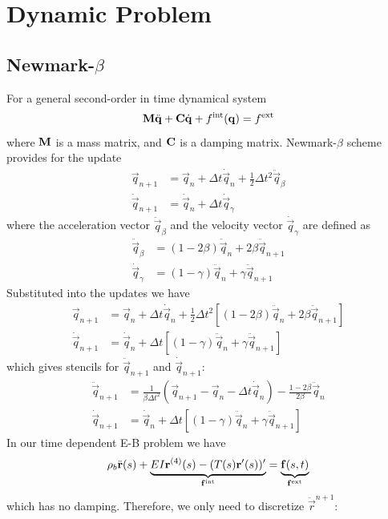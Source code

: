 \section{Dynamic Problem}

\subsection{\texorpdfstring{Newmark-\(\beta\)}{Newmark-beta}}

For a general second-order in time dynamical system
\begin{equation*}
    \mat M \ddot{\vec q} + \mat C \dot{\vec q} + f^{\rm int}(\vec q) = f^{\rm ext}
\end{equation*}
where \(\mat M\) is a mass matrix, and \(\mat C\) is a damping matrix. Newmark-\(\beta\) scheme provides for the update
\begin{align*}
    \vec q_{n+1}        & = \vec q_n + \Delta t \dot{\vec q}_n + \frac12 \Delta t^2 \ddot {\vec q}_\beta \\
    \dot {\vec q}_{n+1} & = \dot{\vec q}_n + \Delta t \dot{\vec q}_\gamma
\end{align*}
where the acceleration vector \(\ddot{\vec q}_\beta\) and the velocity vector \(\dot{\vec q}_\gamma\) are defined as
\begin{align*}
    \ddot{\vec q}_\beta   & = (1-2\beta) \ddot{\vec q}_n + 2\beta\ddot{\vec q}_{n+1}  \\
    \dot{\vec q}_{\gamma} & = (1- \gamma)\ddot{\vec q}_n + \gamma \ddot{\vec q}_{n+1}
\end{align*}
Substituted into the updates we have
\begin{align*}
    \vec q_{n+1}        & = \vec q_n + \Delta t \dot{\vec q}_n + \frac12 \Delta t^2  \left[(1-2\beta) \ddot{\vec q}_n + 2\beta \ddot{\vec q}_{n+1}\right] \\
    \dot {\vec q}_{n+1} & = \dot{\vec q}_n + \Delta t \left[(1- \gamma)\ddot{\vec q}_n + \gamma \ddot{\vec q}_{n+1}\right]
\end{align*}
which gives stencils for \(\ddot{\vec q}_{n+1}\) and \(\dot{\vec q}_{n+1}\):
\begin{align*}
    \ddot{\vec q}_{n+1} & = \frac{1}{\beta \Delta t^2}(\vec q_{n+1} - \vec{q}_n - \Delta t \dot{\vec q}_n) - \frac{1-2\beta}{2\beta}\ddot{\vec q}_n \\
    \dot{\vec q}_{n+1}  & = \dot{\vec q}_n + \Delta t[(1-\gamma)\ddot{\vec q}_n + \gamma \ddot{\vec q}_{n+1}]
\end{align*}
In our time dependent E-B problem we have
\begin{equation*}
    \rho_b \ddot{\vec r}(s) + \underbrace{EI \vec{r}^{(4)}(s) - (T(s) \vec r'(s))'}_{\vec f^{\rm int}} =  \underbrace{\vec f(s,t)}_{\vec f^{\rm ext}}
\end{equation*}
which has no damping. Therefore, we only need to discretize \(\ddot{\vec r}^{n+1}\):
\begin{equation*}
\end{equation*}

